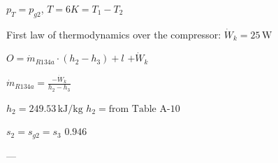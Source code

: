 \( p_T = p_{g2} \), \( T = 6K = T_1 - T_2 \)  

First law of thermodynamics over the compressor:  
\( \dot{W}_k = 25 \, \text{W} \)  

\( O = \dot{m}_{R134a} \cdot (h_2 - h_3) + l \)  
\( + \dot{W}_k \)  

\( \dot{m}_{R134a} = \frac{-\dot{W}_k}{h_2 - h_3} \)  

\( h_2 = 249.53 \, \text{kJ/kg} \)  
\( h_2 = \text{from Table A-10} \)  

\( s_2 = s_{g2} = s_3 \)  
\( 0.946 \)  

---